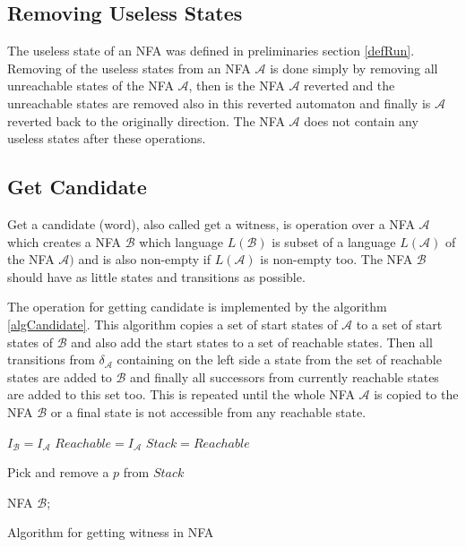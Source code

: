 \subsection{Removing Useless States}
The useless state of an NFA was defined in preliminaries section \ref{defRun}. Removing of the useless states from an NFA $\mathcal{A}$ is done simply by
removing all unreachable states of the NFA $\mathcal{A}$, 
then is the NFA $\mathcal{A}$ reverted and the unreachable states are removed also in this reverted automaton and finally is $\mathcal{A}$ reverted back to the
originally direction. The NFA $\mathcal{A}$ does not contain any useless states after these operations.

\subsection{Get Candidate}
Get a candidate (word), also called get a witness, is operation over a NFA $\mathcal{A}$ which creates a NFA $\mathcal{B}$ which language $L(\mathcal{B})$
is subset of a language $L(\mathcal{A})$ of the NFA $\mathcal{A})$ and is also non-empty if $L(\mathcal{A})$ is non-empty too.
The NFA $\mathcal{B}$ should have as little states and transitions as possible.

The operation for getting candidate is implemented by the algorithm \ref{algCandidate}. This algorithm copies a set of start states 
of $\mathcal{A}$ to a set of start states of $\mathcal{B}$ and also add the start states to a set of reachable states. 
Then all transitions from $\delta_\mathcal{A}$ containing on the left side a state from the set of reachable states are added to $\mathcal{B}$ and finally
all successors from currently reachable states are added to this set too. This is repeated until the whole NFA $\mathcal{A}$ is copied to the NFA 
$\mathcal{B}$ or a final state is not accessible from any reachable state. 
\\

\begin{algorithm}[H]
	\label{algCandidate}



  $I_\mathcal{B} = I_\mathcal{A}$\;
  $Reachable = I_\mathcal{A}$\;
  $Stack = Reachable$\;
	
   {
			Pick and remove a $p$ from $Stack$\;
	}

	\Return NFA $\mathcal{B}$;
	\caption{Algorithm for getting witness in NFA}
\end{algorithm}



